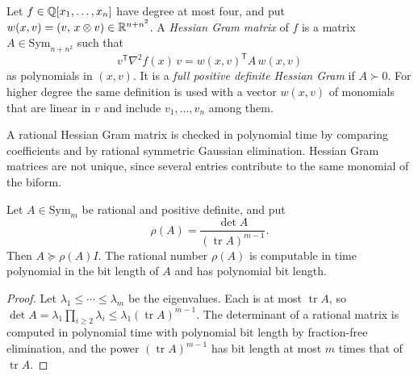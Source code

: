 \begin{definition}
\label{def:models-hessian-gram}
Let $f\in\mathbb Q[x_1,\ldots,x_n]$ have degree at most four, and put
$w(x,v)=(v,\,x\otimes v)\in\mathbb R^{n+n^2}$. A \emph{Hessian Gram matrix} of $f$
is a matrix $A\in\mathrm{Sym}_{n+n^2}$ such that
\[
v^{\mathsf T}\nabla^2f(x)\,v=w(x,v)^{\mathsf T}A\,w(x,v)
\]
as polynomials in $(x,v)$. It is a \emph{full positive definite Hessian
Gram} if $A\succ0$. For higher degree the same definition is used with a
vector $w(x,v)$ of monomials that are linear in $v$ and include
$v_1,\ldots,v_n$ among them.
\end{definition}

A rational Hessian Gram matrix is checked in polynomial time by comparing
coefficients and by rational symmetric Gaussian elimination. Hessian Gram
matrices are not unique, since several entries contribute to the same
monomial of the biform.

\begin{lemma}
\label{lem:models-det-trace}
Let $A\in\mathrm{Sym}_m$ be rational and positive definite, and put
\[
\rho(A)=\frac{\det A}{(\operatorname{tr}A)^{m-1}}.
\]
Then $A\succeq\rho(A)I$. The rational number $\rho(A)$ is computable in time
polynomial in the bit length of $A$ and has polynomial bit length.
\end{lemma}

\begin{proof}
Let $\lambda_1\le\cdots\le\lambda_m$ be the eigenvalues. Each is at most
$\operatorname{tr}A$, so
$\det A=\lambda_1\prod_{i\ge2}\lambda_i\le\lambda_1(\operatorname{tr}A)^{m-1}$.
The determinant of a rational matrix is computed in polynomial time with
polynomial bit length by fraction-free elimination, and the power
$(\operatorname{tr}A)^{m-1}$ has bit length at most $m$ times that of
$\operatorname{tr}A$.
\end{proof}

